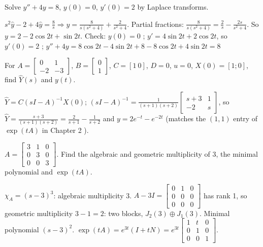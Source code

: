 \begin{qbox}[title={Q3.2 (IVP)}]
Solve $y''+4y=8$, $y(0)=0$, $y'(0)=2$ by Laplace transforms.
\end{qbox}
\begin{solbox}
$s^2\hat y-2+4\hat y=\frac8s\Rightarrow\hat y=\frac{8}{s(s^2+4)}+\frac{2}{s^2+4}$. Partial fractions: $\frac{8}{s(s^2+4)}=\frac2s-\frac{2s}{s^2+4}$.
So $y=2-2\cos2t+\sin2t$. Check: $y(0)=0$ \checkmark; $y'=4\sin2t+2\cos2t$, so $y'(0)=2$ \checkmark; $y''+4y=8\cos2t-4\sin2t+8-8\cos2t+4\sin2t=8$ \checkmark
\end{solbox}

\begin{qbox}[title={Q3.3 (system with initial state)}]
For $A=\begin{bmatrix}0&1\\-2&-3\end{bmatrix}$, $B=\begin{bmatrix}0\\1\end{bmatrix}$, $C=[1\ 0]$, $D=0$, $u=0$, $X(0)=[1;0]$, find $\hat Y(s)$ and $y(t)$.
\end{qbox}
\begin{solbox}
$\hat Y=C(sI-A)^{-1}X(0)$; $(sI-A)^{-1}=\frac1{(s+1)(s+2)}\begin{bmatrix}s+3&1\\-2&s\end{bmatrix}$, so $\hat Y=\frac{s+3}{(s+1)(s+2)}=\frac{2}{s+1}-\frac1{s+2}$
and $y=2e^{-t}-e^{-2t}$ (matches the $(1,1)$ entry of $\exp(tA)$ in Chapter 2 \checkmark).
\end{solbox}

\begin{qbox}[title={Q3.4 (Jordan)}]
$A=\begin{bmatrix}3&1&0\\0&3&0\\0&0&3\end{bmatrix}$. Find the algebraic and geometric multiplicity of $3$, the minimal polynomial and $\exp(tA)$.
\end{qbox}
\begin{solbox}
$\chi_A=(s-3)^3$: algebraic multiplicity 3. $A-3I=\begin{bmatrix}0&1&0\\0&0&0\\0&0&0\end{bmatrix}$ has rank 1, so geometric multiplicity $3-1=2$: two blocks, $J_2(3)\oplus J_1(3)$.
Minimal polynomial $(s-3)^2$. $\exp(tA)=e^{3t}(I+tN)=e^{3t}\begin{bmatrix}1&t&0\\0&1&0\\0&0&1\end{bmatrix}$.
\end{solbox}
\newpage
